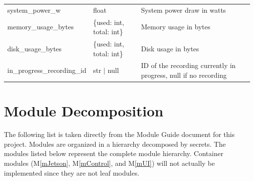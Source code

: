 \documentclass[12pt, titlepage]{article}
\newcommand{\mref}[1]{M\ref{#1}}
\begin{document}
\begin{center}
\begin{tabular}{p{4cm} p{3cm} p{8cm}}
    system\_power\_w            & float                             & System power draw in watts                                      \\
    memory\_usage\_bytes        & \{used: int, total: int\}         & Memory usage in bytes                                           \\
    disk\_usage\_bytes          & \{used: int, total: int\}         & Disk usage in bytes                                             \\
    in\_progress\_recording\_id & str $|$ null                      & ID of the recording currently in progress, null if no recording \\
    \bottomrule
  \end{tabular}
\end{center}

\section{Module Decomposition}

The following list is taken directly from the Module Guide document for this
project. Modules are organized in a hierarchy decomposed by secrets. The
modules listed below represent the complete module hierarchy. Container modules
(\mref{mJetson}, \mref{mControl}, and \mref{mUI}) will not actually be
implemented since they are not leaf modules.
\end{document}
